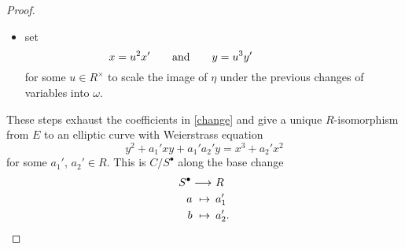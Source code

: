 \documentclass{gtpart}
\theoremstyle{definition}
\theoremstyle{remark}
\newcommand{\ad}{{\rm and}}
\newcommand{\s}{S^\bullet}
\numberwithin{equation}{section}
\numberwithin{thm}{section}
\begin{document}
\begin{proof}
\begin{itemize}
  \item set 
  \[
   x = u^2 x' \qquad \ad \qquad y = u^3 y' \qquad \qquad \quad ~~~
  \]
  for some $u \in R^\times$ to scale the image of $\eta$ under the 
  previous changes of variables into $\omega$.  
 \end{itemize}
 These steps exhaust the coefficients in \eqref{change} and give a 
 unique $R$-isomorphism from $E$ to an elliptic curve with Weierstrass 
 equation 
 \[
  y^2 + a_1' x y + a_1' a_2' y = x^3 + a_2' x^2 
 \]
 for some $a_1'$, $a_2' \in R$.  This is $C/\s$ along the base change 
 \begin{equation*}
 \begin{split}
      \s \longrightarrow & ~ R \\
  a ~ \mapsto \thinspace & ~ a_1' \\
  b ~ \mapsto \thinspace & ~ a_2'.  
 \end{split}
 \end{equation*}
\end{proof}
\end{document}
